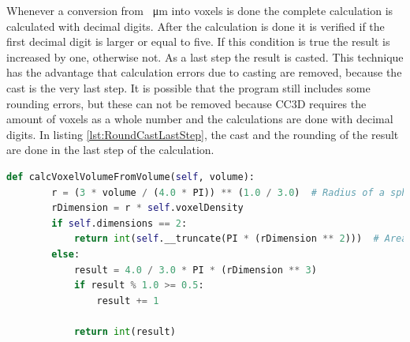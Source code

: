 Whenever a conversion from \SI{}{\micro\metre} into voxels is done the complete calculation is calculated with decimal digits. After the calculation is done it is verified if the first decimal digit is larger or equal to five. If this condition is true the result is increased by one, otherwise not. As a last step the result is casted. This technique has the advantage that calculation errors due to casting are removed, because the cast is the very last step. It is possible that the program still includes some rounding errors, but these can not be removed because \ac{CC3D} requires the amount of voxels as a whole number and the calculations are done with decimal digits. \newline
In listing \ref{lst:RoundCastLastStep}, the cast and the rounding of the result are done in the last step of the calculation.

\begin{lstlisting}[language=Python, caption = {[Modified function to calculate the volume of a cell in voxel out of a physical volume]Function to calculate the volume of a sphere in voxels out of a given physical volume. First out of the given physical volume the radius is calculated. Then it is converted into the voxel unit. Next\, the volume of the voxel sphere is calculated and as last step\, the result is rounded and casted.}, label=lst:RoundCastLastStep]
   def calcVoxelVolumeFromVolume(self, volume):
        r = (3 * volume / (4.0 * PI)) ** (1.0 / 3.0)  # Radius of a sphere with known volume.
        rDimension = r * self.voxelDensity
        if self.dimensions == 2:
            return int(self.__truncate(PI * (rDimension ** 2)))  # Area of a circle.
        else:
            result = 4.0 / 3.0 * PI * (rDimension ** 3)
            if result % 1.0 >= 0.5:
                result += 1

            return int(result)
\end{lstlisting}


